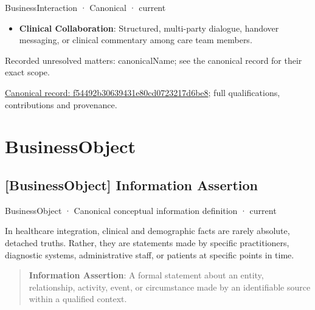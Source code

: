 \label{element:f54492b30639431e80cd0723217d6be8}
{\small BusinessInteraction · Canonical · current}\par

\begin{itemize}


\item \textbf{Clinical Collaboration}: Structured, multi-party dialogue, handover messaging, or clinical commentary among care team members.

\end{itemize}

{\small Recorded unresolved matters: canonicalName; see the canonical record for their exact scope.}\par
{\footnotesize \href{../../../../continuum/business/business-interaction/f54492b30639431e80cd0723217d6be8.md}{Canonical record: f54492b30639431e80cd0723217d6be8}; full qualifications, contributions and provenance.}\par
\section{BusinessObject}

\subsection{[BusinessObject] Information Assertion}

\label{element:f3bd4181bb394db8a505705b03972cea}
{\small BusinessObject · Canonical conceptual information definition · current}\par

In healthcare integration, clinical and demographic facts are rarely absolute, detached truths. Rather, they are statements made by specific practitioners, diagnostic systems, administrative staff, or patients at specific points in time.



\begin{quote}


\textbf{Information Assertion}: A formal statement about an entity, relationship, activity, event, or circumstance made by an identifiable source within a qualified context.



\end{quote}


